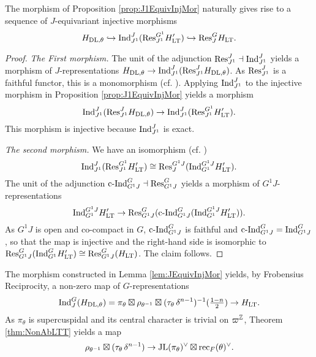 \documentclass[../main.tex]{subfiles}
\begin{document}
\begin{lem} \label{lem:JEquivInjMor}
  The morphism of Proposition \ref{prop:J1EquivInjMor} naturally gives rise to
  a sequence of $J$-equivariant injective morphisms
  \begin{equation*}
    H_{\mathrm{DL},\theta} \hookrightarrow \mathrm{Ind}_{J^1}^J (\mathrm{Res}_{J^1}^{G^1} H'_{\mathrm{LT}}) \hookrightarrow \mathrm{Res}_J^G H_{\mathrm{LT}}.
  \end{equation*}
\begin{proof}
  \textit{The First morphism.}
  The unit of the adjunction $\mathrm{Res}_{J^1}^J \dashv \mathrm{Ind}_{J^1}^J$ yields a
  morphism of $J$-representations $H_{\mathrm{DL},\theta} \to \mathrm{Ind}_{J^1}^J(\mathrm{Res}_{J^1}^{J}
  H_{\mathrm{DL}, \theta})$. As $\mathrm{Res}_{J^1}^J$ is a faithful functor, this 
  is a monomorphism (cf. \cite[Lemma 4.5.13]{riehl2017category}). 
  Applying $\mathrm{Ind}_{J^1}^J$ to the injective morphism in Proposition
  \ref{prop:J1EquivInjMor} yields a morphism
  \begin{equation*}
    \mathrm{Ind}_{J^1}^J ( \mathrm{Res}_{J^1}^J H_{\mathrm{DL},\theta} ) \to  \mathrm{Ind}_{J^1}^J
    (\mathrm{Res}_{J^1}^{G^1} H'_{\mathrm{LT}}).
  \end{equation*}
  This morphism is injective because $\mathrm{Ind}_{J^1}^J$ is exact. 

  \textit{The second morphism.} 
  We have an isomorphism (cf. \cite[p.40]{mieda2016geometric})
  \begin{equation*}
  \mathrm{Ind}_{J^1}^J( \mathrm{Res}_{J^1}^{G^1} H'_{\mathrm{LT}}) \cong \mathrm{Res}_J^{G^1J}( \mathrm{Ind}_{G^1}^{G^1J} H'_{\mathrm{LT}}).
  \end{equation*}
  The unit of the adjunction $\mathrm{c\text{-}Ind}_{G^1J}^G \dashv \mathrm{Res}_{G^1J}^G$ yields a 
  morphism of $G^1J$-representations 
  \begin{equation*}
    \mathrm{Ind}_{G^1}^{G^1J} H_{\mathrm{LT}}' \to \mathrm{Res}_{G^1J}^G
    (\mathrm{c\text{-}Ind}_{G^1J}^G(\mathrm{Ind}_{G^1}^{G^1J} H'_{\mathrm{LT}})).
  \end{equation*}
  As $G^1J$ is open and co-compact in $G$, $\mathrm{c\text{-}Ind}_{G^1J}^G$ is faithful and 
  $\mathrm{c\text{-}Ind}_{G^1J}^G = \mathrm{Ind}_{G^1J}^G$, so that the map is injective and the right-hand
  side is isomorphic to $\mathrm{Res}_{G^1J}^G(\mathrm{Ind}_{G^1}^G H'_{\mathrm{LT}}) \cong
  \mathrm{Res}_{G^1J}^G(H_{\mathrm{LT}})$. The claim follows.
\end{proof}
\end{lem}

The morphism constructed in Lemma \ref{lem:JEquivInjMor} yields, by Frobensius
Reciprocity, a non-zero map of $G$-representations
\begin{equation} \label{eq:WantedMap}
  \mathrm{Ind}_{J}^G (H_{\mathrm{DL},\theta}) = \pi_\theta \boxtimes \rho_{\theta^{-1}}
  \boxtimes (\tau_\theta \, \delta^{n-1})^{-1}(\tfrac{1-n}2) \to H_{\mathrm{LT}}.
\end{equation}
As $\pi_\theta$ is supercuspidal and its central character is trivial on 
$\varpi^{\mathbb{Z}}$, Theorem \ref{thm:NonAbLTT} yields a map
\begin{equation*}
  \rho_{\theta^{-1}} \boxtimes (\tau_\theta \, \delta^{n-1}) \to
  \mathrm{JL}(\pi_\theta)^\vee \boxtimes \mathrm{rec}_F(\theta)^\vee.
\end{equation*}








\end{document}
